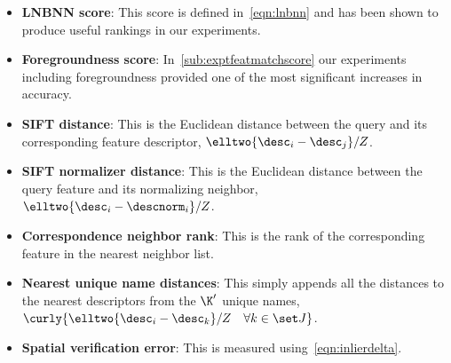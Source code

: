            \begin{itemize}
                \item \textbf{LNBNN score}:
                    This score is defined in~\cref{eqn:lnbnn} and has been shown to produce useful rankings in our
                      experiments.
                    
                \item \textbf{Foregroundness score}:
                    In~\cref{sub:exptfeatmatchscore} our experiments including foregroundness provided one of the most
                      significant increases in accuracy.
                    
                \item \textbf{SIFT \correspondence{} distance}:
                    This is the Euclidean distance between the query and its corresponding feature descriptor,
                      $\elltwo{\desc_i - \desc_j} / Z$.
                    
                \item \textbf{SIFT normalizer distance}:
                    This is the Euclidean distance between the query feature and its normalizing neighbor,
                      $\elltwo{\desc_i - \descnorm_{i}} / Z$.
                    
                \item \textbf{Correspondence neighbor rank}:
                    This is the rank of the corresponding feature in the nearest neighbor list.
                    
                \item \textbf{Nearest unique name distances}:
                    This simply appends all the distances to the nearest descriptors from the $\K'$ unique names,
                      $\curly{\elltwo{\desc_i - \desc_{k}} / Z \quad \forall k \in \Jname}$.

                \item \textbf{Spatial verification error}:
                    This is measured using~\cref{eqn:inlierdelta}.
                    
            \end{itemize}
            
